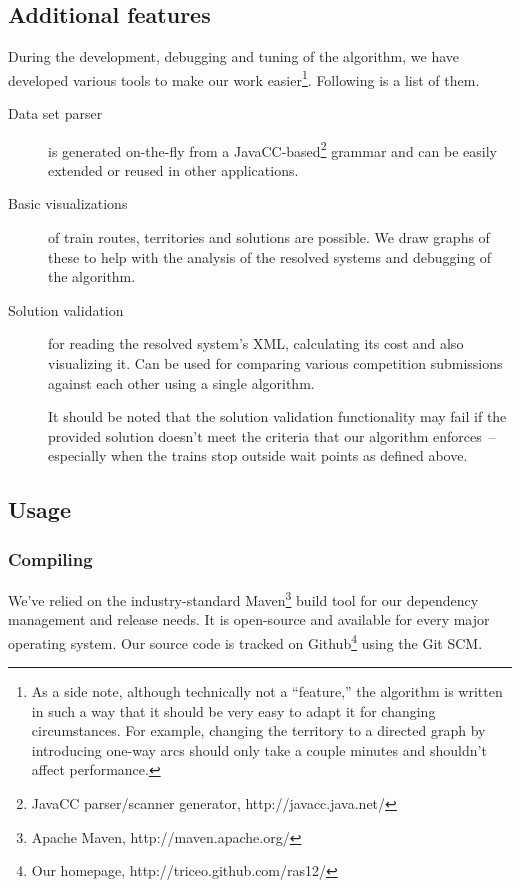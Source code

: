 \documentclass[10pt,a4paper,final]{article}
\begin{document}
\subsection{Additional features} 

During the development, debugging and tuning of the algorithm, we have developed various tools to make our work easier\footnote{As a side note, although technically not a ``feature,'' the algorithm is written in such a way that it should be very easy to adapt it for changing circumstances. For example, changing the territory to a directed graph by introducing one-way arcs should only take a couple minutes and shouldn't affect performance.}. Following is a list of them.

\begin{description}

\item[Data set parser] is generated on-the-fly from a JavaCC-based\footnote{JavaCC parser/scanner generator, http://javacc.java.net/} grammar and can be easily extended or reused in other applications.

\item[Basic visualizations] of train routes, territories and solutions are possible. We draw graphs of these to help with the analysis of the resolved systems and debugging of the algorithm.

\item[Solution validation] for reading the resolved system's XML, calculating its cost and also visualizing it. Can be used for comparing various competition submissions against each other using a single algorithm.

It should be noted that the solution validation functionality may fail if the provided solution doesn't meet the criteria that our algorithm enforces~-- especially when the trains stop outside wait points as defined above.

\end{description}


\subsection{Usage}

\subsubsection{Compiling}

We've relied on the industry-standard Maven\footnote{Apache Maven, http://maven.apache.org/} build tool for our dependency management and release needs. It is open-source and available for every major operating system. Our source code is tracked on Github\footnote{Our homepage, http://triceo.github.com/ras12/} using the Git SCM.
\end{document}
